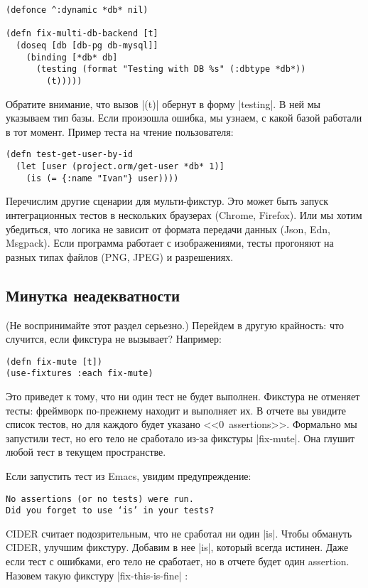 \begin{verbatim}
(defonce ^:dynamic *db* nil)

(defn fix-multi-db-backend [t]
  (doseq [db [db-pg db-mysql]]
    (binding [*db* db]
      (testing (format "Testing with DB %s" (:dbtype *db*))
        (t)))))
\end{verbatim}

Обратите внимание, что вызов \spverb|(t)| обернут в форму \spverb|testing|. В
ней мы указываем тип базы. Если произошла ошибка, мы узнаем, с какой базой
работали в тот момент. Пример теста на чтение пользователя:

\begin{verbatim}
(defn test-get-user-by-id
  (let [user (project.orm/get-user *db* 1)]
    (is (= {:name "Ivan"} user))))
\end{verbatim}

Перечислим другие сценарии для мульти-фикстур. Это может быть запуск
интеграционных тестов в нескольких браузерах (Chrome, Firefox). Или мы хотим
убедиться, что логика не зависит от формата передачи данных (Json, Edn,
Msgpack). Если программа работает с изображениями, тесты прогоняют на разных
типах файлов (PNG, JPEG) и разрешениях.

\subsection{Минутка неадекватности}

(Не воспринимайте этот раздел серьезно.) Перейдем в другую крайность: что
случится, если фикстура не вызывает? Например:

\begin{verbatim}
(defn fix-mute [t])
(use-fixtures :each fix-mute)
\end{verbatim}

Это приведет к тому, что ни один тест не будет выполнен. Фикстура не отменяет
тесты: фреймворк по-прежнему находит и выполняет их. В отчете вы увидите список
тестов, но для каждого будет указано <<0~assertions>>. Формально мы запустили
тест, но его тело не сработало из-за фикстуры \spverb|fix-mute|. Она глушит
любой тест в текущем пространстве.

Если запустить тест из Emacs, увидим предупреждение:

\begin{verbatim}
No assertions (or no tests) were run.
Did you forget to use ‘is’ in your tests?
\end{verbatim}

CIDER считает подозрительным, что не сработал ни один \spverb|is|. Чтобы
обмануть CIDER, улучшим фикстуру. Добавим в нее \spverb|is|, который всегда
истинен. Даже если тест с ошибками, его тело не сработает, но в отчете будет
один assertion. Назовем такую фикстуру \spverb|fix-this-is-fine|%
:


